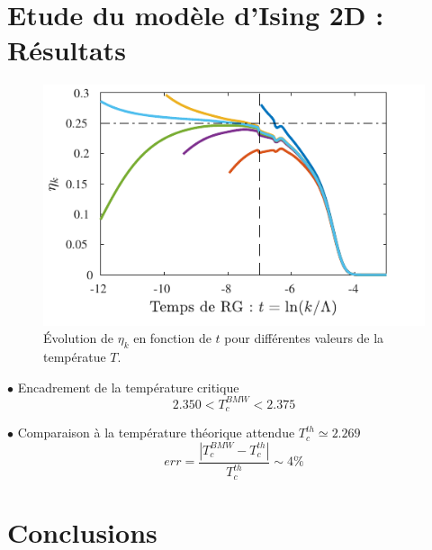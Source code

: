 \documentclass[9pt]{beamer}
\begin{document}
		
		\section{Etude du modèle d'Ising 2D : Résultats}
		\sommaire{}
		\begin{frame}
	\justifying
	\vspace*{22pt}
	
	\begin{figure}[H]
\begin{center}
	\includegraphics[scale=0.7]{MesuRes.pdf}
\end{center}
\caption{Évolution de $\eta_k$ en fonction de $t$ pour différentes valeurs de la températue $T$.}
\label{fig:etaMesu}
\end{figure}

$\bullet$ Encadrement de la température critique
\begin{equation}
2.350  < T_c^{BMW}  < 2.375 
\end{equation}

$\bullet $ Comparaison à la température théorique attendue $T_c^{th} \simeq 2.269$
\begin{equation}
	err = \frac{ |T_c^{BMW} - T_c^{th}|}{T_c^{th}} \sim 4 \%
\end{equation}



	
	\end{frame}

	
	\section{Conclusions}
	
	\sommaire{}
	
\end{document}
